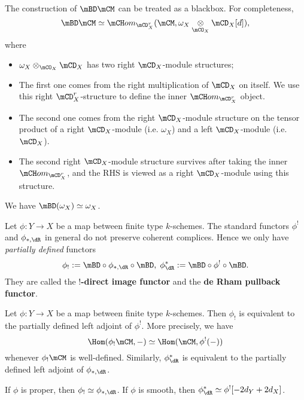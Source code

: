 	\begin{rem}
		The construction of $\mBD\mCM$ can be treated as a blackbox. For completeness,
		\[
			\mBD\mCM \simeq \mCH om_{\mCD_X^r}( \mCM, \omega_X\ot_{\mCO_X}\mCD_X[d] ),
		\]
		where
		\begin{itemize}
			\item 
				$\omega_X\ot_{\mCO_X}\mCD_X$ has two right $\mCD_X$-module structures;
			\item
				The first one comes from the right multiplication of $\mCD_X$ on itself. We use this right $\mCD_X^r$-structure to define the inner $\mCH om_{\mCD_X^r}$ object.
			\item
				The second one comes from the right $\mCD_X$-module structure on the tensor product of a right $\mCD_X$-module (i.e. $\omega_X$) and a left $\mCD_X$-module (i.e. $\mCD_X$).
			\item
				The second right $\mCD_X$-module structure survives after taking the inner $\mCH om_{\mCD_X^r}$, and the RHS is viewed as a right $\mCD_X$-module using this structure.
		\end{itemize}
		

	\end{rem}

	\begin{exam}
		We have $\mBD(\omega_X) \simeq \omega_X$.
	\end{exam}
	
	\begin{constr}
		Let $\phi:Y \to X$ be a map between finite type $k$-schemes. The standard functors $\phi^!$ and $\phi_{*,\dR}$ in general do not preserve coherent complices. Hence we only have \emph{partially defined} functors
		\[
			\phi_!:= \mBD \circ \phi_{*,\dR}\circ \mBD,\; \phi_\dR^{*}:=\mBD \circ \phi^!\circ \mBD.
		\]
		They are called the \textbf{$!$-direct image functor} and the \textbf{de Rham pullback functor}.
	\end{constr}

	\begin{facts}
		Let $\phi:Y \to X$ be a map between finite type $k$-schemes. Then $\phi_!$ is equivalent to the partially defined left adjoint of $\phi^!$. More precisely, we have
		\[
			\Hom(\phi_!\mCM,-) \simeq \Hom( \mCM,\phi^!(-) )
		\]
		whenever $\phi_!\mCM$ is well-defined. Similarly, $\phi_\dR^*$ is equivalent to the partially defined left adjoint of $\phi_{*,\dR}$.
	\end{facts}

	\begin{rem}
		If $\phi$ is proper, then $\phi_!\simeq \phi_{*,\dR}$. If $\phi$ is smooth, then $\phi_\dR^* \simeq \phi^![-2d_Y + 2d_X]$.

	\end{rem}

